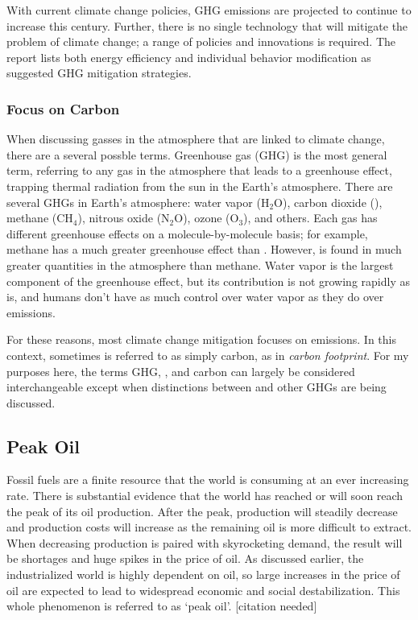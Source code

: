 With current climate change policies, GHG emissions are projected to continue to increase this century. Further, there is no single technology that will mitigate the problem of climate change; a range of policies and innovations is required. The report lists both energy efficiency and individual behavior modification as suggested GHG mitigation strategies.

\subsubsection{Focus on Carbon}

When discussing gasses in the atmosphere that are linked to climate change, there are a several possble terms. Greenhouse gas (GHG) is the most general term, referring to any gas in the atmosphere that leads to a greenhouse effect, trapping thermal radiation from the sun in the Earth's atmosphere. There are several GHGs in Earth's atmosphere: water vapor (H$_2$O), carbon dioxide (\COtwo), methane (CH$_4$), nitrous oxide (N$_2$O), ozone (O$_3$), and others. Each gas has different greenhouse effects on a molecule-by-molecule basis; for example, methane has a much greater greenhouse effect than \COtwo.  However, \COtwo is found in much greater quantities in the atmosphere than methane. Water vapor is the largest component of the greenhouse effect, but its contribution is not growing rapidly as \COtwo is, and humans don't have as much control over water vapor as they do over \COtwo emissions.

For these reasons, most climate change mitigation focuses on \COtwo emissions. In this context, sometimes \COtwo is referred to as simply carbon, as in \emph{carbon footprint}. For my purposes here, the terms GHG, \COtwo, and carbon can largely be considered interchangeable except when distinctions between \COtwo and other GHGs are being discussed.

\subsection{Peak Oil}

Fossil fuels are a finite resource that the world is consuming at an ever increasing rate. There is substantial evidence that the world has reached or will soon reach the peak of its oil production. After the peak, production will steadily decrease and production costs will increase as the remaining oil is more difficult to extract. When decreasing production is paired with skyrocketing demand, the result will be shortages and huge spikes in the price of oil. As discussed earlier, the industrialized world is highly dependent on oil, so large increases in the price of oil are expected to lead to widespread economic and social destabilization. This whole phenomenon is referred to as `peak oil'. [citation needed]

